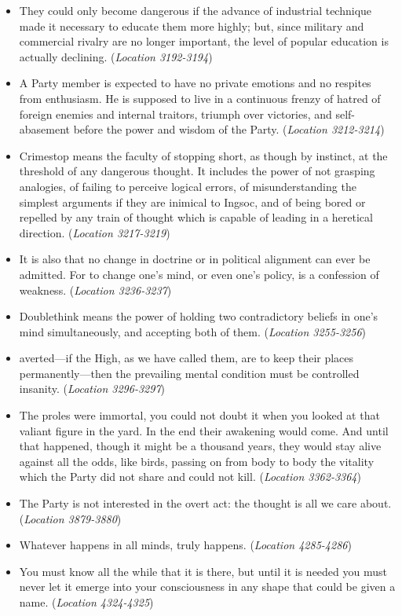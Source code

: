 \documentclass[12pt]{article}
\begin{document}
\begin{itemize}
\item {They could only become dangerous if the advance of industrial technique made it necessary to educate them more highly; but, since military and commercial rivalry are no longer important, the level of popular education is actually declining. (\textit{Location 3192-3194})}
\item {A Party member is expected to have no private emotions and no respites from enthusiasm. He is supposed to live in a continuous frenzy of hatred of foreign enemies and internal traitors, triumph over victories, and self-abasement before the power and wisdom of the Party. (\textit{Location 3212-3214})}
\item {Crimestop means the faculty of stopping short, as though by instinct, at the threshold of any dangerous thought. It includes the power of not grasping analogies, of failing to perceive logical errors, of misunderstanding the simplest arguments if they are inimical to Ingsoc, and of being bored or repelled by any train of thought which is capable of leading in a heretical direction. (\textit{Location 3217-3219})}
\item {It is also that no change in doctrine or in political alignment can ever be admitted. For to change one’s mind, or even one’s policy, is a confession of weakness. (\textit{Location 3236-3237})}
\item {Doublethink means the power of holding two contradictory beliefs in one’s mind simultaneously, and accepting both of them. (\textit{Location 3255-3256})}
\item {averted—if the High, as we have called them, are to keep their places permanently—then the prevailing mental condition must be controlled insanity. (\textit{Location 3296-3297})}
\item {The proles were immortal, you could not doubt it when you looked at that valiant figure in the yard. In the end their awakening would come. And until that happened, though it might be a thousand years, they would stay alive against all the odds, like birds, passing on from body to body the vitality which the Party did not share and could not kill. (\textit{Location 3362-3364})}
\item {The Party is not interested in the overt act: the thought is all we care about. (\textit{Location 3879-3880})}
\item {Whatever happens in all minds, truly happens. (\textit{Location 4285-4286})}
\item {You must know all the while that it is there, but until it is needed you must never let it emerge into your consciousness in any shape that could be given a name. (\textit{Location 4324-4325})}

\end{itemize}
\end{document}
